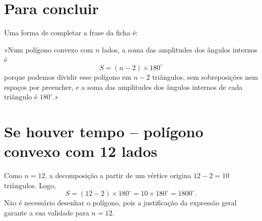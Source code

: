 \section*{Para concluir}

Uma forma de completar a frase da ficha é:

\begin{tcolorbox}[
colback=azulClaro,colframe=azulPDMI!40,boxrule=.5pt,
arc=2mm,left=8pt,right=8pt,top=6pt,bottom=6pt]
«Num polígono convexo com $n$ lados, a soma das amplitudes
dos ângulos internos é
\[
\boxed{S=(n-2)\times180^\circ}
\]
porque podemos dividir esse polígono em $n-2$ triângulos,
sem sobreposições nem espaços por preencher,
e a soma das amplitudes dos ângulos internos de cada
triângulo é $180^\circ$.»
\end{tcolorbox}

\section*{Se houver tempo -- polígono convexo com 12 lados}

Como $n=12$, a decomposição a partir de um vértice
origina $12-2=10$ triângulos. Logo,
\[
S=(12-2)\times180^\circ
=10\times180^\circ
=\boxed{1800^\circ}.
\]
Não é necessário desenhar o polígono, pois a justificação
da expressão geral garante a sua validade para $n=12$.

\endgroup
